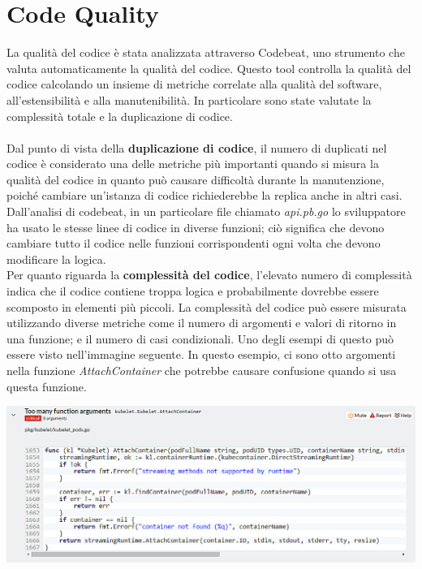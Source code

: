 \documentclass[12pt, a4paper]{report}
\begin{document}
\section{Code Quality}
La qualità del codice è stata analizzata attraverso Codebeat, uno strumento che valuta automaticamente la qualità del codice. Questo tool controlla la qualità del codice calcolando un insieme di metriche correlate alla qualità del software, all'estensibilità e alla manutenibilità. In particolare sono state valutate la complessità totale e la duplicazione di codice.\\
\\
Dal punto di vista della \textbf{duplicazione di codice}, il numero di duplicati nel codice è considerato una delle metriche più importanti quando si misura la qualità del codice in quanto può causare difficoltà durante la manutenzione, poiché cambiare un'istanza di codice richiederebbe la replica anche in altri casi. Dall'analisi di codebeat, in un particolare file chiamato \textit{api.pb.go} lo sviluppatore ha usato le stesse linee di codice in diverse funzioni; ciò significa che devono cambiare tutto il codice nelle funzioni corrispondenti ogni volta che devono modificare la logica.\\
Per quanto riguarda la \textbf{complessità del codice}, l'elevato numero di complessità indica che il codice contiene troppa logica e probabilmente dovrebbe essere scomposto in elementi più piccoli. La complessità del codice può essere misurata utilizzando diverse metriche come il numero di argomenti e valori di ritorno in una funzione; e il numero di casi condizionali. Uno degli esempi di questo può essere visto nell'immagine seguente.
\newpage
In questo esempio, ci sono otto argomenti nella funzione \textit{AttachContainer} che potrebbe causare confusione quando si usa questa funzione.
\begin{center}
  \includegraphics[width=\linewidth]{Images/Kubernetes-codecomplexity}\\
\end{center}
\end{document}
